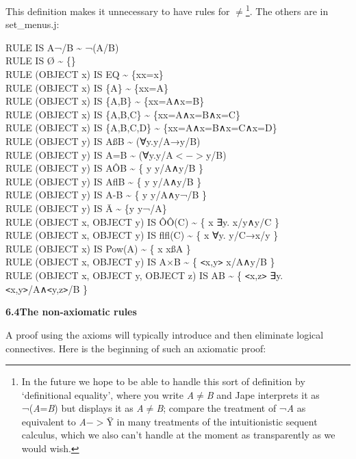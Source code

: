 \documentclass[11pt]{book}
\newcommand{\tab}{\hspace{5mm}}
\begin{document}
This definition makes it unnecessary to have rules for \ensuremath{\neq}\footnote{In the future we hope to be able to handle this sort of definition by `definitional equality', where you write \textit{A}\ensuremath{\neq}\textit{B} and Jape interprets it as ¬(\textit{A}=\textit{B}) but displays it as \textit{A}\ensuremath{\neq}\textit{B}; compare the treatment of ¬\textit{A} as equivalent to \textit{A}\ensuremath{->}\"{Y} in many treatments of the intuitionistic sequent calculus, which we also can't handle at the moment as transparently as we would wish.}. The others are in set\_menus.j:

RULE IS A¬/B \~{} ¬(A/B)\\
RULE IS {\O} \~{} \{\}\\
RULE (OBJECT x) IS EQ \~{} \{x{\textbar}x=x\}\\
RULE (OBJECT x) IS \{A\} \~{} \{x{\textbar}x=A\}\\
RULE (OBJECT x) IS \{A,B\} \~{} \{x{\textbar}x=A∧x=B\}\\
RULE (OBJECT x) IS \{A,B,C\} \~{} \{x{\textbar}x=A∧x=B∧x=C\}\\
RULE (OBJECT x) IS \{A,B,C,D\} \~{} \{x{\textbar}x=A∧x=B∧x=C∧x=D\}\\
RULE (OBJECT y) IS A{\ss}B \~{} (∀y.y/A→y/B)\\
RULE (OBJECT y) IS A=B \~{} (∀y.y/A$<->$y/B)\\
RULE (OBJECT y) IS A\^{O}B \~{} \{ y {\textbar} y/A∧y/B \}\\
RULE (OBJECT y) IS AflB \~{} \{ y {\textbar} y/A∧y/B \}\\
RULE (OBJECT y) IS A-B \~{} \{ y {\textbar} y/A∧y¬/B \}\\
RULE (OBJECT y) IS A\={} \~{} \{y {\textbar} y¬/A\}\\
RULE (OBJECT x, OBJECT y) IS \^{O}\^{O}(C) \~{} \{ x {\textbar} ∃y. x/y∧y/C \}\\
RULE (OBJECT x, OBJECT y) IS flfl(C) \~{} \{ x {\textbar} ∀y. y/C→x/y \}\\
RULE (OBJECT x) IS Pow(A) \~{} \{ x {\textbar} x{\ss}A \}\\
RULE (OBJECT x, OBJECT y) IS A$\times$B \~{} \{ \texttt{<}x,y\texttt{>} {\textbar} x/A∧y/B \}\\
RULE (OBJECT x, OBJECT y, OBJECT z) IS A{\textbullet}B \~{} \{ \texttt{<}x,z\texttt{>} {\textbar} ∃y.\texttt{<}x,y\texttt{>}/A∧\texttt{<}y,z\texttt{>}/B \}


\textbf{6.4\tab The non-axiomatic rules}


A proof using the axioms will typically introduce and then eliminate logical connectives. Here is the beginning of such an axiomatic proof:
\end{document}
